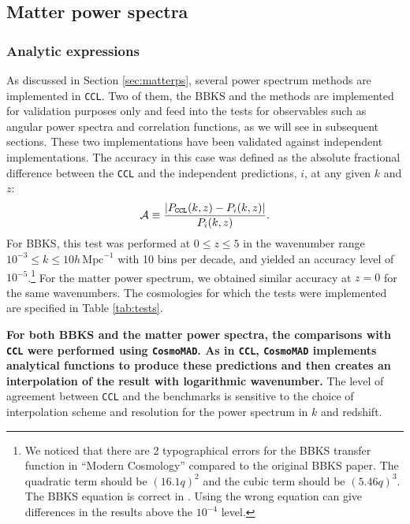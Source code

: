 \documentclass[\docopts]{\docclass}
\newcommand{\ccl}{{\tt CCL}\xspace}
\begin{document}
\subsection{Matter power spectra}

\subsubsection{Analytic expressions}
\label{ss:bbksval}

As discussed in Section \ref{sec:matterps}, several power spectrum methods are implemented in \ccl. Two of them, the BBKS \citep{BBKS} and the \citet{1998ApJ...496..605E} methods are implemented for validation purposes only and feed into the tests for observables such as angular power spectra and correlation functions, as we will see in subsequent sections. These two implementations have been validated against independent implementations. The accuracy in this case was defined as the absolute fractional difference between the \ccl and the independent predictions, $i$, at any given $k$ and $z$:
\begin{equation}
  \mathcal{A}\equiv \frac{|P_{\tt CCL}(k,z)-P_{i}(k,z)|}{P_i(k,z)}.
  \label{eq:pkacc}
\end{equation}
For BBKS, this test was performed at $0\leq z \leq 5$ in the wavenumber range $10^{-3} \leq k \leq 10 h\,\text{Mpc}^{-1}$ with 10 bins per decade, and yielded an accuracy level of $10^{-5}$.\footnote{We noticed that there are 2 typographical errors for the BBKS transfer function in ``Modern Cosmology'' \citep{DodelsonBook} compared to the original BBKS paper. The quadratic term should be $(16.1q)^2$ and the cubic term should be $(5.46q)^3$. The BBKS equation is correct in \citet{PeacockBook}. Using the wrong equation can give differences in the results above the $10^{-4}$ level.}
For the \citet{1998ApJ...496..605E} matter power spectrum, we obtained similar accuracy at $z=0$ for the same wavenumbers. The cosmologies for which the tests were implemented are specified in Table \ref{tab:tests}.

{\bf For both BBKS and the \citet{1998ApJ...496..605E} matter power spectra, the comparisons with \ccl were performed using {\tt CosmoMAD}. As in \ccl, {\tt CosmoMAD} implements analytical functions to produce these predictions and then creates an interpolation of the result with logarithmic wavenumber.} The level of agreement between \ccl and the benchmarks is sensitive to the choice of interpolation scheme and resolution for the power spectrum in $k$ and redshift.
\end{document}
